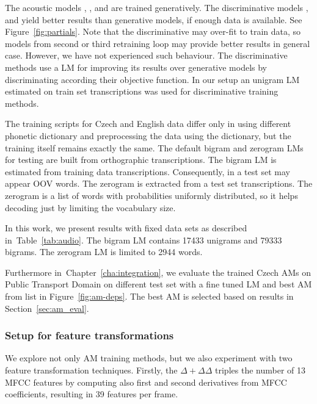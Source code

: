 The acoustic models , , 
and  are trained generatively.
The discriminative models ,  and  yield better results than generative models, if enough data is available. 
See Figure~\ref{fig:partials}.
Note that the discriminative may over-fit to train data, so models from second or third retraining loop may provide better results in general case. 
However, we have not experienced such behaviour.
The discriminative methods use a \ac{LM} for improving its results over generative models by discriminating according their objective function.
In our setup an unigram \ac{LM} estimated on train set transcriptions was used for discriminative training methods.

The training scripts for Czech and English data differ only in using different phonetic dictionary and preprocessing the data using the dictionary, but the training itself remains exactly the same.
The default bigram and zerogram \acp{LM} for testing are built from orthographic transcriptions.
The bigram \ac{LM} is estimated from training data transcriptions. 
Consequently, in a test set may appear \acl{OOV} words.
The zerogram is extracted from a test set transcriptions.
The zerogram is a list of words with probabilities uniformly distributed, so it helps decoding just by limiting the vocabulary size.

In this work, we present results with fixed data sets as described in~Table~\ref{tab:audio}.
The bigram \ac{LM} contains 17433 unigrams and 79333 bigrams. The zerogram \ac{LM} is limited to 2944 words.

Furthermore in~Chapter~\ref{cha:integration}, we evaluate the trained Czech \acp{AM} on Public Transport Domain on different test set with a fine tuned \ac{LM} and best \ac{AM} from list in Figure~\ref{fig:am-deps}.
The best \ac{AM} is selected based on results in Section~\ref{sec:am_eval}.


\subsubsection*{Setup for feature transformations}
We explore not only \ac{AM} training methods, but we also experiment with two feature transformation techniques.
Firstly, the $\Delta + \Delta\Delta$ triples the number of 13 \ac{MFCC} features by computing also first and second derivatives from \ac{MFCC} coefficients, resulting in 39 features per frame.

